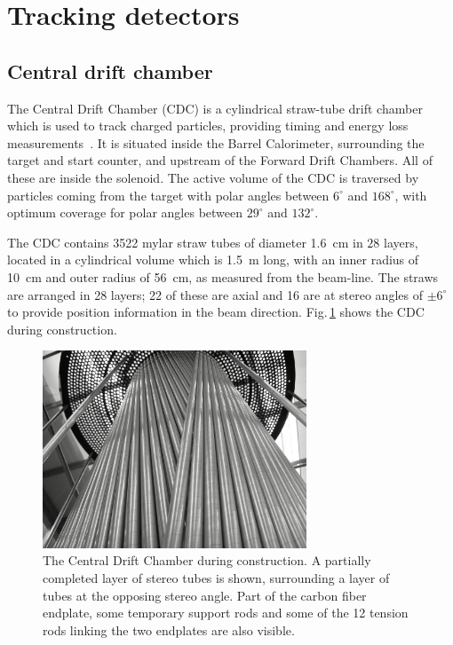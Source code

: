 \section{Tracking detectors \label{sec:tracking}}
\subsection[Central drift chamber (Naomi)]{Central drift chamber \label{sec:cdc}}

The Central Drift Chamber (CDC) is a cylindrical straw-tube drift chamber which is used to track charged particles, providing timing and energy loss measurements~\cite{GlueXCDCNIM}.
It is situated inside the Barrel Calorimeter, surrounding the target and start counter, and upstream of the Forward Drift Chambers. 
All of these are inside the solenoid. 
The active volume of the CDC is traversed
by particles coming from the target with polar angles between $6^{\circ}$ and $168^{\circ}$, with optimum 
coverage for polar angles between $29^{\circ}$ and $132^{\circ}$.  

The CDC contains 3522 mylar straw tubes of diameter 1.6~cm in $28$ layers,
located in a cylindrical volume which is 1.5~m long, with an inner radius of 10~cm and outer radius of 56~cm, as measured from the beam-line.  
The straws are arranged in 28 layers; 22 of these are axial and 16 are at stereo angles of $\pm 6^{\circ}$ to provide position information in the beam direction. Fig.\,\ref{fig:CDC_stereotubes}  shows the CDC during construction. 

\begin{figure}[tbp]
\begin{center}
\includegraphics[width=0.7\textwidth]{figures/CDC_stereotubes}  
\caption{\label{fig:CDC_stereotubes}          
  The Central Drift Chamber during construction. A partially completed layer of stereo tubes is shown, surrounding a layer of tubes at the opposing stereo angle. Part of the carbon fiber endplate, some temporary support rods and some of the 12 tension rods linking the two endplates are also visible. 
}   
\end{center}  
\end{figure}

